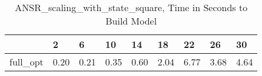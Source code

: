 \begin{table}
\caption{ANSR\_scaling\_with\_state\_square, Time in Seconds to Build Model}
\label{ANSR_scaling_with_state_square_model_time}
\begin{tabular}{lllllllll}
\toprule
 & 2 & 6 & 10 & 14 & 18 & 22 & 26 & 30 \\
\midrule
full\_opt & 0.20 & 0.21 & 0.35 & 0.60 & 2.04 & 6.77 & 3.68 & 4.64 \\
\bottomrule
\end{tabular}
\end{table}
